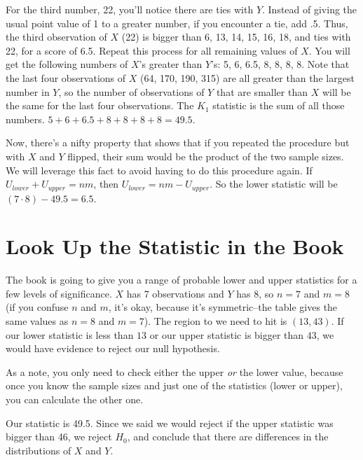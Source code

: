 \documentclass[12pt]{article}
\begin{document}
For the third number, 22, you'll notice there are ties with $Y$. Instead of giving the usual point value of 1 to a greater number, if you encounter a tie, add .5. Thus, the third observation of $X$ (22) is bigger than 6, 13, 14, 15, 16, 18, and ties with 22, for a score of 6.5. Repeat this process for all remaining values of $X$. You will get the following numbers of $X$'s greater than $Y$'s: 5, 6, 6.5, 8, 8, 8, 8. Note that the last four observations of $X$ (64, 170, 190, 315) are all greater than the largest number in $Y$, so the number of observations of $Y$ that are smaller than $X$ will be the same for the last four observations. The $K_1$ statistic is the sum of all those numbers. $5 + 6 + 6.5 + 8 + 8 + 8 + 8 = 49.5$.

Now, there's a nifty property that shows that if you repeated the procedure but with $X$ and $Y$ flipped, their sum would be the product of the two sample sizes. We will leverage this fact to avoid having to do this procedure again. If $U_{lower} + U_{upper} = nm$, then $U_{lower} = nm - U_{upper}$. So the lower statistic will be $(7 \cdot 8) - 49.5 = 6.5$.

\section{Look Up the Statistic in the Book}
The book is going to give you a range of probable lower and upper statistics for a few levels of significance. $X$ has 7 observations and $Y$ has 8, so $n=7$ and $m=8$ (if you confuse $n$ and $m$, it's okay, because it's symmetric--the table gives the same values as $n=8$ and $m=7$). The region to we need to hit is $(13,43)$. If our lower statistic is less than $13$ or our upper statistic is bigger than $43$, we would have evidence to reject our null hypothesis.

As a note, you only need to check either the upper \emph{or} the lower value, because once you know the sample sizes and just one of the statistics (lower or upper), you can calculate the other one. 

Our statistic is 49.5. Since we said we would reject if the upper statistic was bigger than 46, we reject $H_0$, and conclude that there are differences in the distributions of $X$ and $Y$. 
\end{document}
